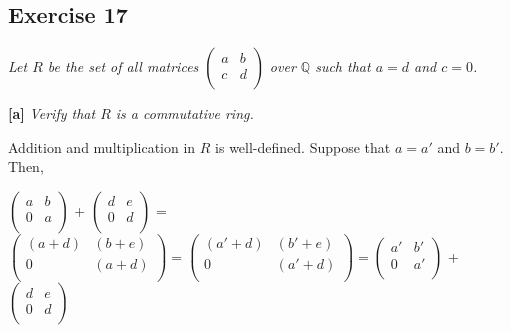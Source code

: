\subsection*{Exercise 17}
\textit{Let $R$ be the set of all matrices $\left(%
    \begin{array}{cc}
      a & b \\
      c & d \\
    \end{array}%
    \right)$ over $\mathbb{Q}$ such that $a=d$ and $c=0$.}
\vspace{5 mm}

\textbf{[a]} \textit{Verify that $R$ is a commutative ring.}
\vspace{3 mm}

Addition and multiplication in $R$ is well-defined. Suppose that $a = a'$ and $b = b'$. Then,

$\left(%
\begin{array}{cc}
  a & b \\
  0 & a \\
\end{array}%
\right)$ + 
    $\left(%
    \begin{array}{cc}
      d & e \\
      0 & d \\
    \end{array}%
    \right)$ = 
    $\left(%
    \begin{array}{cc}
      (a+d) & (b+e) \\
      0 & (a+d) \\
    \end{array}%
    \right) =
    \left(%
    \begin{array}{cc}
      (a'+d) & (b'+e) \\
      0 & (a'+d) \\
    \end{array}%
    \right) =
    \left(%
\begin{array}{cc}
  a' & b' \\
  0 & a' \\
\end{array}%
\right)$ + 
    $\left(%
    \begin{array}{cc}
      d & e \\
      0 & d \\
    \end{array}%
    \right)$


